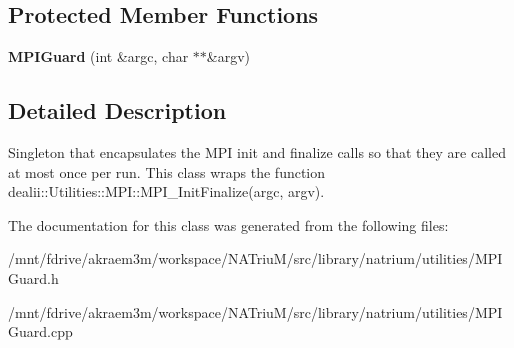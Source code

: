 \subsection*{Protected Member Functions}
\begin{DoxyCompactItemize}
\item 
\hypertarget{classnatrium_1_1MPIGuard_a1e07fafea3f7724d0d2dd9c106e1a44b}{
{\bfseries MPIGuard} (int \&argc, char $\ast$$\ast$\&argv)}
\label{classnatrium_1_1MPIGuard_a1e07fafea3f7724d0d2dd9c106e1a44b}

\end{DoxyCompactItemize}


\subsection{Detailed Description}
Singleton that encapsulates the MPI init and finalize calls so that they are called at most once per run. This class wraps the function dealii::Utilities::MPI::MPI\_\-InitFinalize(argc, argv). 

The documentation for this class was generated from the following files:\begin{DoxyCompactItemize}
\item 
/mnt/fdrive/akraem3m/workspace/NATriuM/src/library/natrium/utilities/MPIGuard.h\item 
/mnt/fdrive/akraem3m/workspace/NATriuM/src/library/natrium/utilities/MPIGuard.cpp\end{DoxyCompactItemize}
